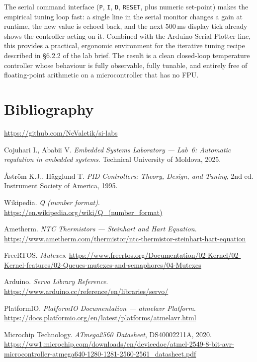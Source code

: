 \documentclass[12pt]{article}
\begin{document}
\hspace{0.8cm}
The serial command interface (\texttt{P}, \texttt{I}, \texttt{D}, \texttt{RESET}, plus numeric set-point) makes the empirical tuning loop fast: a single line in the serial monitor changes a gain at runtime, the new value is echoed back, and the next 500\,ms display tick already shows the controller acting on it. Combined with the Arduino Serial Plotter line, this provides a practical, ergonomic environment for the iterative tuning recipe described in §6.2.2 of the lab brief. The result is a clean closed-loop temperature controller whose behaviour is fully observable, fully tunable, and entirely free of floating-point arithmetic on a microcontroller that has no FPU.

\section{Bibliography}

\begingroup
\makeatletter
\renewcommand{\section}[2]{}
\makeatother

\begin{thebibliography}{}

  \url{https://github.com/NeValetik/si-labs}

  Cojuhari I., Ababii V. \textit{Embedded Systems Laboratory --- Lab~6: Automatic regulation in embedded systems}.
  Technical University of Moldova, 2025.

  Åström K.J., Hägglund T. \textit{PID Controllers: Theory, Design, and Tuning}, 2nd ed.
  Instrument Society of America, 1995.

  Wikipedia. \textit{Q (number format)}.
  \url{https://en.wikipedia.org/wiki/Q\_(number\_format)}

  Ametherm. \textit{NTC Thermistors --- Steinhart and Hart Equation}.
  \url{https://www.ametherm.com/thermistor/ntc-thermistor-steinhart-hart-equation}

  FreeRTOS. \textit{Mutexes}.
  \url{https://www.freertos.org/Documentation/02-Kernel/02-Kernel-features/02-Queues-mutexes-and-semaphores/04-Mutexes}

  Arduino. \textit{Servo Library Reference}.
  \url{https://www.arduino.cc/reference/en/libraries/servo/}

  PlatformIO. \textit{PlatformIO Documentation --- atmelavr Platform}.
  \url{https://docs.platformio.org/en/latest/platforms/atmelavr.html}

  Microchip Technology. \textit{ATmega2560 Datasheet}, DS40002211A, 2020.
  \url{https://ww1.microchip.com/downloads/en/devicedoc/atmel-2549-8-bit-avr-microcontroller-atmega640-1280-1281-2560-2561_datasheet.pdf}

\end{thebibliography}
\endgroup

\pagebreak
\end{document}
